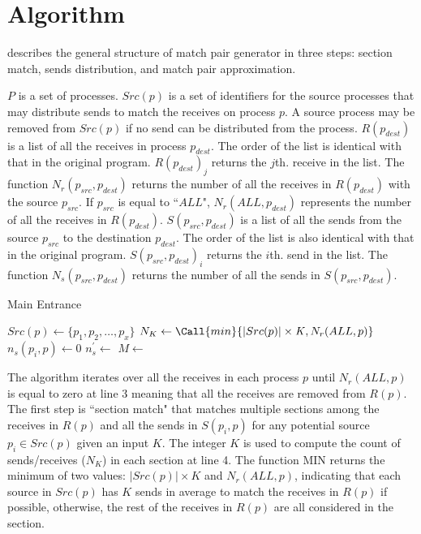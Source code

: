 \section{Algorithm}
 describes the general structure of match pair generator in three steps: section match, sends distribution, and match pair approximation. 

$\mathit{P}$ is a set of processes. $Src(p)$ is a set of identifiers for the source processes that may distribute sends to match the receives on process $p$. A source process may be removed from $Src(p)$ if no send can be distributed from the process.
$R(p_{dest})$ is a list of all the receives in process $p_{dest}$. The order of the list is identical with that in the original program. $R(p_{dest})_j$ returns the $j$th. receive in the list.
The function $N_r(p_{src},p_{dest})$ returns the number of all the receives in $R(p_{dest})$ with the source $p_{src}$. If $p_{src}$ is equal to ``$ALL$", $N_r(ALL ,p_{dest})$ represents the number of all the receives in $R(p_{dest})$.
$S(p_{src},p_{dest})$ is a list of all the sends from the source $p_{src}$ to the destination $p_{dest}$. The order of the list is also identical with that in the original program. $S(p_{src},p_{dest})_i$ returns the $i$th. send in the list.
The function $N_s(p_{src},p_{dest})$ returns the number of all the sends in $S(p_{src},p_{dest})$. 

\begin{algorithm}
\caption{Main Entrance}\label{algo:main}
\begin{algorithmic}[1]
\State $Src(p)\gets\{p_1,p_2,\ldots,p_x\}$   
\State $N_K \gets \Call{min}{|Src(p)|\times\mathit{K}, N_r(ALL,p)}$
\State $\mathit{n_s}(p_i,p)\gets 0$
\EndFor
\State $\mathit{n_s^\prime}\gets$
\State $M\gets$
\State {} 
\State {}
\EndFor
\EndWhile
\EndFor
\end{algorithmic}
\end{algorithm}

The algorithm iterates over all the receives in each process $p$ until $N_r(ALL,p)$ is equal to zero at line 3 meaning that all the receives are removed from $R(p)$. 
The first step is ``section match" that matches multiple sections among the receives in $R(p)$ and all the sends in $S(p_{i},p)$ for any potential source $p_{i}\in Src(p)$ given an input $K$. 
The integer $\mathit{K}$ is used to compute the count of sends/receives ($N_K$) in each section at line 4. The function $\mathrm{MIN}$ returns the minimum of two values: $|Src(p)|\times\mathit{K}$ and $ N_r(ALL,p)$, indicating that each source in $Src(p)$ has $K$ sends in average to match the receives in $R(p)$ if possible, otherwise, the rest of the receives in $R(p)$ are all considered in the section. 


